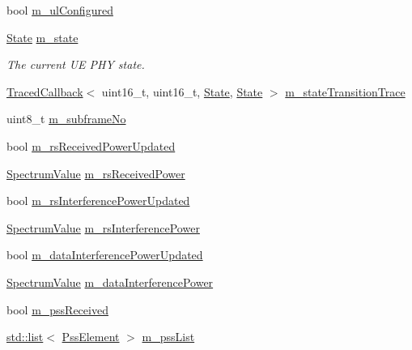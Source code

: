 \begin{DoxyCompactItemize}
\item 
bool \hyperlink{classns3_1_1LteUePhy_ac90075a25fb13b52d70c1937cf83dd56}{m\+\_\+ul\+Configured}
\item 
\hyperlink{classns3_1_1LteUePhy_ae5118801f100c494663f0ca1e942aa31}{State} \hyperlink{classns3_1_1LteUePhy_a5a8bad2a7221da5f87727d53d58b481f}{m\+\_\+state}
\begin{DoxyCompactList}\small\item\em The current UE P\+HY state. \end{DoxyCompactList}\item 
\hyperlink{classns3_1_1TracedCallback}{Traced\+Callback}$<$ uint16\+\_\+t, uint16\+\_\+t, \hyperlink{classns3_1_1LteUePhy_ae5118801f100c494663f0ca1e942aa31}{State}, \hyperlink{classns3_1_1LteUePhy_ae5118801f100c494663f0ca1e942aa31}{State} $>$ \hyperlink{classns3_1_1LteUePhy_ab86ca96c3346a3d9143e03faf4093f13}{m\+\_\+state\+Transition\+Trace}
\item 
uint8\+\_\+t \hyperlink{classns3_1_1LteUePhy_a7a570be9003110d7dfaecf414bc34543}{m\+\_\+subframe\+No}
\item 
bool \hyperlink{classns3_1_1LteUePhy_abd50d8b4eab7a7dd0cb44267d4cb982d}{m\+\_\+rs\+Received\+Power\+Updated}
\item 
\hyperlink{classns3_1_1SpectrumValue}{Spectrum\+Value} \hyperlink{classns3_1_1LteUePhy_a6ed253b11e81be61b177836490e4d07b}{m\+\_\+rs\+Received\+Power}
\item 
bool \hyperlink{classns3_1_1LteUePhy_a4ab51d98c08937a722e722ec81ba0f58}{m\+\_\+rs\+Interference\+Power\+Updated}
\item 
\hyperlink{classns3_1_1SpectrumValue}{Spectrum\+Value} \hyperlink{classns3_1_1LteUePhy_a92beda3e8ae6ee294e38365264fdd81d}{m\+\_\+rs\+Interference\+Power}
\item 
bool \hyperlink{classns3_1_1LteUePhy_ae176dc7063316f7806143506e4f14506}{m\+\_\+data\+Interference\+Power\+Updated}
\item 
\hyperlink{classns3_1_1SpectrumValue}{Spectrum\+Value} \hyperlink{classns3_1_1LteUePhy_a07392a887af77cad0363fb50b9bc4b1e}{m\+\_\+data\+Interference\+Power}
\item 
bool \hyperlink{classns3_1_1LteUePhy_a5ab022b1bccbff633af1f2189b68305a}{m\+\_\+pss\+Received}
\item 
\hyperlink{openflow-interface_8h_afd9bcfa176617760671b67580f536fa7}{std\+::list}$<$ \hyperlink{structns3_1_1LteUePhy_1_1PssElement}{Pss\+Element} $>$ \hyperlink{classns3_1_1LteUePhy_a65bf8a30d9bdcfbe5f8e2faac4007406}{m\+\_\+pss\+List}
\item 

\end{DoxyCompactItemize}
